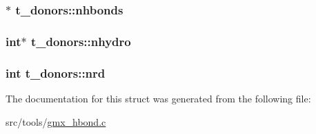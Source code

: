 \hypertarget{structt__donors_ade9b44c12eaab75e8a401badbc97dec2}{
\subsubsection[{nhbonds}]{$\ast$ {\bf t\-\_\-donors\-::nhbonds}}}\label{structt__donors_ade9b44c12eaab75e8a401badbc97dec2}
\hypertarget{structt__donors_a08f8d0ec7c7c2e196e709d815ab373b4}{
\subsubsection[{nhydro}]{\setlength{\rightskip}{0pt plus 5cm}int$\ast$ {\bf t\-\_\-donors\-::nhydro}}}\label{structt__donors_a08f8d0ec7c7c2e196e709d815ab373b4}
\hypertarget{structt__donors_aec1b63043d369c49427f51b2f8e1327f}{
\subsubsection[{nrd}]{\setlength{\rightskip}{0pt plus 5cm}int {\bf t\-\_\-donors\-::nrd}}}\label{structt__donors_aec1b63043d369c49427f51b2f8e1327f}


\-The documentation for this struct was generated from the following file\-:\begin{DoxyCompactItemize}
\item 
src/tools/\hyperlink{gmx__hbond_8c}{gmx\-\_\-hbond.\-c}\end{DoxyCompactItemize}
